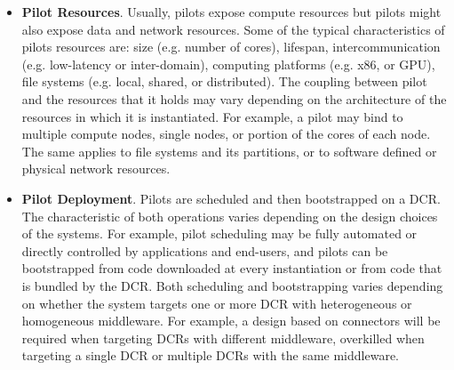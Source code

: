 \documentclass{sig-alternate}
\begin{document}
\begin{itemize}

\item \textbf{Pilot Resources}. Usually, pilots expose compute resources but
  pilots might also expose data and network resources. Some of the typical
  characteristics of pilots resources are: size (e.g. number of cores),
  lifespan, intercommunication (e.g. low-latency or inter-domain), computing
  platforms (e.g. x86, or GPU), file systems (e.g. local, shared, or
  distributed). The coupling between pilot and the resources that it holds may
  vary depending on the architecture of the resources in which it is
  instantiated. For example, a pilot may bind to multiple compute nodes, single
  nodes, or portion of the cores of each node. The same applies to file systems
  and its partitions, or to software defined or physical network resources.


\item \textbf{Pilot Deployment}. Pilots are scheduled and then bootstrapped on a
  DCR. The characteristic of both operations varies depending on the design
  choices of the \pilot systems. For example, pilot scheduling may be fully
  automated or directly controlled by applications and end-users, and pilots can
  be bootstrapped from code downloaded at every instantiation or from code that
  is bundled by the DCR. Both scheduling and bootstrapping varies depending on
  whether the \pilot system targets one or more DCR with heterogeneous or
  homogeneous middleware. For example, a design based on connectors will be
  required when targeting DCRs with different middleware, overkilled when
  targeting a single DCR or multiple DCRs with the same middleware.  


\end{itemize}
\end{document}
